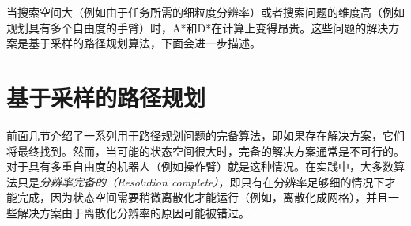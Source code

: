 当搜索空间大（例如由于任务所需的细粒度分辨率）或者搜索问题的维度高（例如规划具有多个自由度的手臂）时，A*和D*在计算上变得昂贵。这些问题的解决方案是基于采样的路径规划算法，下面会进一步描述。

\section{基于采样的路径规划}


前面几节介绍了一系列用于路径规划问题的完备算法，即如果存在解决方案，它们将最终找到。然而，当可能的状态空间很大时，完备的解决方案通常是不可行的。对于具有多重自由度的机器人（例如操作臂）就是这种情况。在实践中，大多数算法只是\emph{分辨率完备的（Resolution complete）}，即只有在分辨率足够细的情况下才能完成，因为状态空间需要稍微离散化才能运行（例如，离散化成网格），并且一些解决方案由于离散化分辨率的原因可能被错过。


